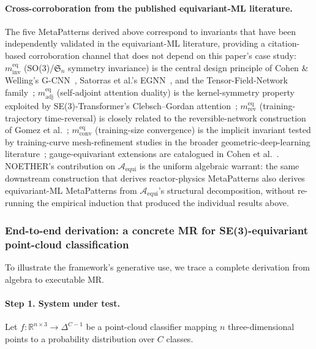 \documentclass[acmsmall,screen,review]{acmart}
\begin{document}
\paragraph{Cross-corroboration from the published equivariant-ML literature.}
The five MetaPatterns derived above correspond to invariants that have been independently validated in the equivariant-ML literature, providing a citation-based corroboration channel that does not depend on this paper's case study: $m^{\mathrm{eq}}_{\mathrm{inv}}$ (SO(3)/$\mathfrak{S}_n$ symmetry invariance) is the central design principle of Cohen \& Welling's G-CNN~\cite{CohenWelling2016}, Satorras et al.'s EGNN~\cite{Satorras2021EGNN}, and the Tensor-Field-Network family~\cite{ThomasSmidt2018}; $m^{\mathrm{eq}}_{\mathrm{adj}}$ (self-adjoint attention duality) is the kernel-symmetry property exploited by SE(3)-Transformer's Clebsch--Gordan attention~\cite{FuchsTransformer2020}; $m^{\mathrm{eq}}_{\mathrm{rev}}$ (training-trajectory time-reversal) is closely related to the reversible-network construction of Gomez et al.~\cite{Gomez2017Reversible}; $m^{\mathrm{eq}}_{\mathrm{conv}}$ (training-size convergence) is the implicit invariant tested by training-curve mesh-refinement studies in the broader geometric-deep-learning literature~\cite{Bronstein2021GDL}; gauge-equivariant extensions are catalogued in Cohen et al.~\cite{Cohen2019Gauge}. NOETHER's contribution on $\mathcal{A}_{\mathrm{equi}}$ is the uniform algebraic warrant: the same downstream construction that derives reactor-physics MetaPatterns also derives equivariant-ML MetaPatterns from $\mathcal{A}_{\mathrm{equi}}$'s structural decomposition, without re-running the empirical induction that produced the individual results above.

\subsubsection{End-to-end derivation: a concrete MR for SE(3)-equivariant point-cloud classification}
\label{subsec:rho-rot}
\label{subsec:end-to-end}

To illustrate the framework's generative use, we trace a complete derivation from algebra to executable MR.

\paragraph{Step 1. System under test.} Let $f: \mathbb{R}^{n\times 3} \to \Delta^{C-1}$ be a point-cloud classifier mapping $n$ three-dimensional points to a probability distribution over $C$ classes.
\end{document}
